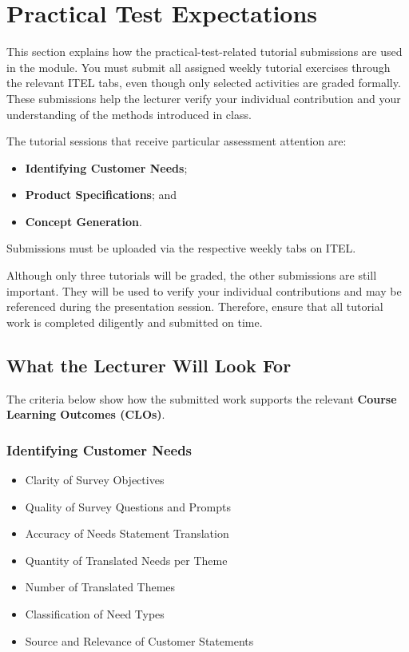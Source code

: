 \section{Practical Test Expectations}

This section explains how the practical-test-related tutorial submissions are used in the module. You must submit all assigned weekly tutorial exercises through the relevant ITEL tabs, even though only selected activities are graded formally. These submissions help the lecturer verify your individual contribution and your understanding of the methods introduced in class.

The tutorial sessions that receive particular assessment attention are:
\begin{itemize}
    \item \textbf{Identifying Customer Needs};
    \item \textbf{Product Specifications}; and
    \item \textbf{Concept Generation}.
\end{itemize}

Submissions must be uploaded via the respective weekly tabs on ITEL.

Although only three tutorials will be graded, the other submissions are still important. They will be used to verify your individual contributions and may be referenced during the presentation session. Therefore, ensure that all tutorial work is completed diligently and submitted on time.





\subsection{What the Lecturer Will Look For}

The criteria below show how the submitted work supports the relevant \textbf{Course Learning Outcomes (CLOs)}.

\subsubsection{Identifying Customer Needs}
\begin{itemize}
    \item Clarity of Survey Objectives
    \item Quality of Survey Questions and Prompts
    \item Accuracy of Needs Statement Translation
    \item Quantity of Translated Needs per Theme
    \item Number of Translated Themes
    \item Classification of Need Types
    \item Source and Relevance of Customer Statements
\end{itemize}

